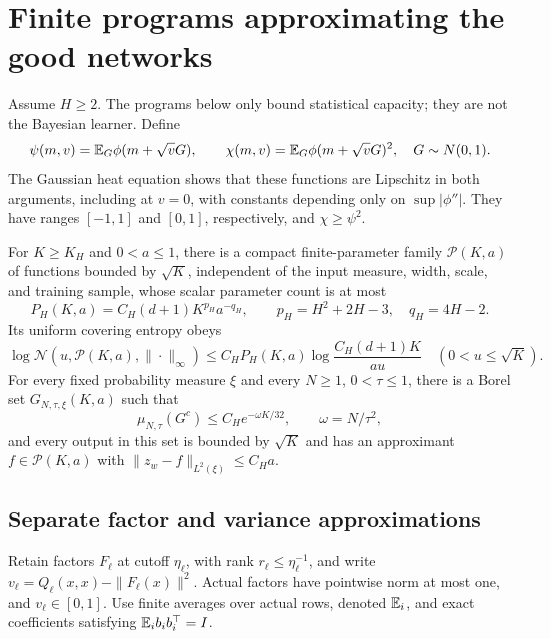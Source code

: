 \section{Finite programs approximating the good networks}
\label{sec:compression}
Assume $H\ge2$. The programs below only bound statistical capacity; they are not the Bayesian learner. Define
\[
 \psi(m,v)=\mathbb E_G\phi(m+\sqrt vG),\qquad
 \chi(m,v)=\mathbb E_G\phi(m+\sqrt vG)^2,\quad G\sim N(0,1).
\]
The Gaussian heat equation shows that these functions are Lipschitz in both arguments, including at $v=0$, with constants depending only on $\sup|\phi''|$. They have ranges $[-1,1]$ and $[0,1]$, respectively, and $\chi\ge\psi^2$.

\begin{proposition}
\label{prop:programs}
For $K\ge K_H$ and $0<a\le1$, there is a compact finite-parameter family $\mathcal P(K,a)$ of functions bounded by $\sqrt K$, independent of the input measure, width, scale, and training sample, whose scalar parameter count is at most
\begin{equation}
 P_H(K,a)=C_H(d+1)K^{p_H}a^{-q_H},\qquad
 p_H=H^2+2H-3,\quad q_H=4H-2.
 \label{eq:program-count}
\end{equation}
Its uniform covering entropy obeys
\begin{equation}
 \log\mathcal N(u,\mathcal P(K,a),\|\cdot\|_\infty)
 \le C_HP_H(K,a)\log\frac{C_H(d+1)K}{au}
 \quad(0<u\le\sqrt K).
 \label{eq:program-entropy}
\end{equation}
For every fixed probability measure $\xi$ and every $N\ge1$, $0<\tau\le1$, there is a Borel set $G_{N,\tau,\xi}(K,a)$ such that
\begin{equation}
 \mu_{N,\tau}(G^c)\le C_He^{-\omega K/32},\qquad \omega=N/\tau^2,
 \label{eq:direct-prior-good}
\end{equation}
and every output in this set is bounded by $\sqrt K$ and has an approximant $f\in\mathcal P(K,a)$ with $\|z_w-f\|_{L^2(\xi)}\le C_Ha$.
\end{proposition}

\subsection{Separate factor and variance approximations}
Retain factors $F_\ell$ at cutoff $\eta_\ell$, with rank $r_\ell\le\eta_\ell^{-1}$, and write $v_\ell=Q_\ell(x,x)-\|F_\ell(x)\|^2$. Actual factors have pointwise norm at most one, and $v_\ell\in[0,1]$. Use finite averages over actual rows, denoted $\mathbb E_i$, and exact coefficients satisfying $\mathbb E_i b_i b_i^\top=I$.

